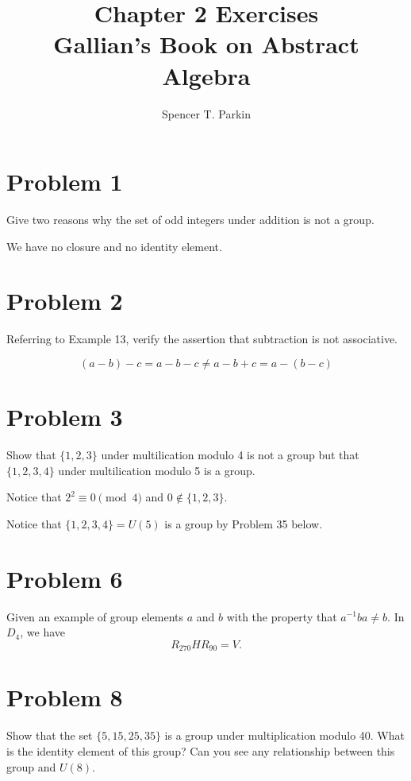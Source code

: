 \documentclass[12pt]{article}
\title{Chapter 2 Exercises\\Gallian's Book on Abstract Algebra}
\author{Spencer T. Parkin}
\begin{document}
\maketitle

\section*{Problem 1}

Give two reasons why the set of odd integers under addition is not a group.

We have no closure and no identity element.

\section*{Problem 2}

Referring to Example 13, verify the assertion that subtraction is not associative.

\begin{equation*}
(a-b)-c = a-b-c \neq a-b+c = a-(b-c)
\end{equation*}

\section*{Problem 3}

Show that $\{1,2,3\}$ under multilication modulo 4 is not a group but that
$\{1,2,3,4\}$ under multilication modulo 5 is a group.

Notice that $2^2\equiv 0\pmod{4}$ and $0\not\in\{1,2,3\}$.

Notice that $\{1,2,3,4\}=U(5)$ is a group by Problem 35 below.

\section*{Problem 6}

Given an example of group elements $a$ and $b$ with the property that
$a^{-1}ba\neq b$.
In $D_4$, we have
\begin{equation*}
R_{270}HR_{90} = V.
\end{equation*}

\section*{Problem 8}

Show that the set $\{5,15,25,35\}$ is a group under multiplication modulo 40.
What is the identity element of this group?  Can you see any relationship
between this group and $U(8)$.
\end{document}
